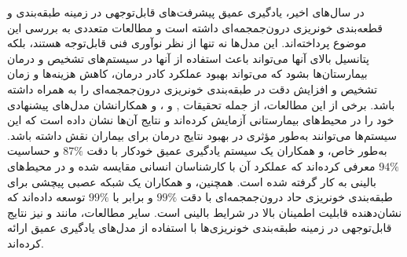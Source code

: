  در سال‌های اخیر، یادگیری عمیق پیشرفت‌های قابل‌توجهی در زمینه طبقه‌بندی و قطعه‌بندی خونریزی درون‌جمجمه‌ای داشته است و مطالعات متعددی به بررسی این موضوع پرداخته‌اند. این مدل‌ها نه تنها از نظر نوآوری فنی قابل‌توجه هستند، بلکه پتانسیل بالای آنها می‌تواند باعث استفاده از آنها در سیستم‌های تشخیص و درمان بیمارستان‌ها بشود که می‌تواند بهبود عملکرد کادر درمان، کاهش هزینه‌ها و زمان تشخیص و افزایش دقت در طبقه‌بندی خونریزی درون‌جمجمه‌ای را به همراه داشته باشد. برخی از این مطالعات، از جمله تحقیقات
  \cite{titano2018automated}, \cite{arbabshirani2018advanced} و \cite{kuo2019expert}،
و همکارانشان مدل‌های پیشنهادی خود را در محیط‌های بیمارستانی آزمایش کرده‌اند و نتایج آن‌ها نشان داده است که این سیستم‌ها می‌توانند به‌طور مؤثری در بهبود نتایج درمان برای بیماران نقش داشته باشد. به‌طور خاص،  و همکاران یک سیستم یادگیری عمیق خودکار با دقت \(87\%\) و حساسیت \(94\%\) معرفی کرده‌اند که عملکرد آن با کارشناسان انسانی مقایسه شده و در محیط‌های بالینی به کار گرفته شده است. همچنین،  و همکاران یک شبکه عصبی پیچشی برای طبقه‌بندی خونریزی حاد درون‌جمجمه‌ای با دقت \(99\%\) و  برابر با
 \(99\%\)
توسعه داده‌اند که نشان‌دهنده قابلیت اطمینان بالا در شرایط بالینی است. سایر مطالعات، مانند
 \cite{chang2018hybrid}
  و
   \cite{chilamkurthy2018deep}
    نیز نتایج قابل‌توجهی در زمینه طبقه‌بندی خونریزی‌ها با استفاده از مدل‌های یادگیری عمیق ارائه کرده‌اند.
 
